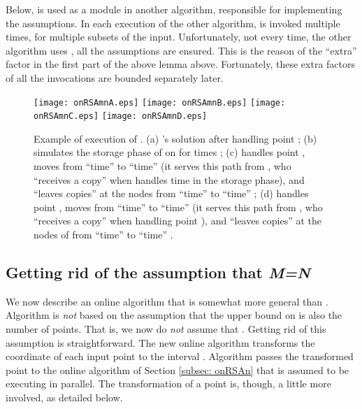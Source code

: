 \documentclass[11pt]{article}
\begin{document}
Below,   is used as a module in another algorithm, responsible for implementing the assumptions.
In each execution of the other algorithm,  is invoked multiple times, for multiple subsets of the input.
Unfortunately, not every time, the other algorithm uses , all the assumptions are ensured.
This is the reason of the ``extra'' factor  in the first part of the above lemma above.
Fortunately, these extra factors of all the invocations are bounded separately later.



\def\FigonRSAnEXE{
\begin{figure}
\begin{center}
\texttt{[image: onRSAmnA.eps]}
\hfill
\texttt{[image: onRSAmnB.eps]}
\hfill
\texttt{[image: onRSAmnC.eps]}
\hfill
\texttt{[image: onRSAmnD.eps]}
\end{center}
\caption{\sf Example of execution of .
(a) 's solution after handling point ;
(b)  simulates the storage phase of  on  for times ;
(c)  handles point , moves  from ``time''  to ``time''  (it serves this path from , who ``receives a copy'' when  handles time  in the storage phase),
and ``leaves copies'' at the nodes  from ``time''  to ``time'' ;
(d)  handles point ,
 moves  from ``time''  to ``time''  (it serves this path from , who ``receives a copy'' when handling point ), and
 ``leaves  copies'' at the nodes of  from ``time''  to ``time'' .
\label{fig: onRSAmn execution}}
\end{figure}
} \FigonRSAnEXE





\subsection{Getting rid of the assumption that {\bf\em M=N}}
\label{subsec: onRSAmn}
We now describe an online algorithm  that is somewhat more general than . Algorithm  is {\em not} based on the assumption that the upper bound  on  is also the number of points.
That is, we now do {\em not} assume that . Getting rid of this assumption is straightforward.
The new online algorithm  transforms the  coordinate of each input point to the interval . Algorithm  passes the transformed point to the online algorithm  of Section \ref{subsec: onRSAn} that is assumed to be executing in parallel. The transformation of a point is, though, a little more involved, as detailed below.
\end{document}
